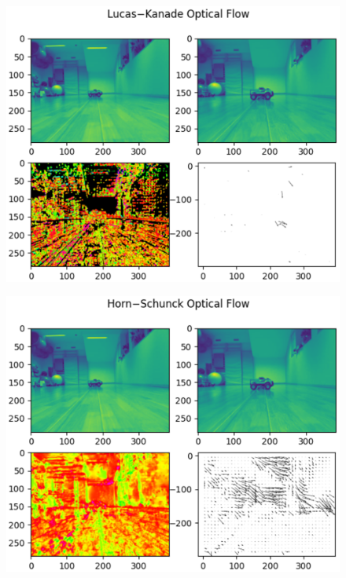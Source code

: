 \documentclass[9pt]{IEEEtran}
\begin{document}
\begin{figure}[h]
    \centering
    \includegraphics[width=1\columnwidth]{disparitylk.eps}
    \label{fig:collisionlk}
\end{figure}
\begin{figure}[h]
    \centering
    \includegraphics[width=1\columnwidth]{disparityhs.eps}
    \label{fig:collisionhs}
\end{figure}
\end{document}
